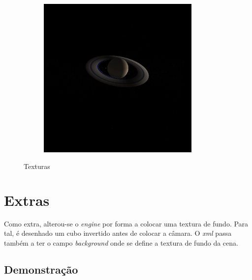 \documentclass[11pt,a4paper]{report}
\begin{document}
\begin{figure}[H]
\begin{subfigure}{0.5\textwidth}
  \caption{\texttt{}}
  \label{fig:jupiter}
\end{subfigure}%
\begin{subfigure}{0.5\textwidth}
  \centering
  \includegraphics[width = 8cm,height = 8cm]{saturn.png}
  \caption{\texttt{}}
  \label{fig:saturn}
\end{subfigure}
\label{fig:texturas}
\caption{Texturas}
\end{figure}



\newpage
\section{Extras}
Como extra, alterou-se o \textit{engine} por forma a colocar uma textura de fundo.
Para tal, é desenhado um cubo invertido antes de colocar a câmara. O \textit{xml} passa também a ter o campo \textit{background} onde se define a textura de fundo da cena.

\subsection{Demonstração}
\end{document}
